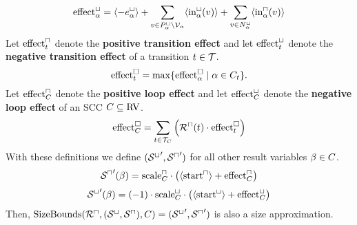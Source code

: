 \begin{theorem}
  \[ \text{effect}^\sqcup_\alpha = \langle-e^{\sqcup}_\alpha\rangle + \sum_{v \in P_\alpha^\sqcup \setminus \mathcal{V}_\alpha} \langle\text{in}^\sqcup_\alpha(v)\rangle + \sum_{v \in N_\alpha^\sqcup} \langle\text{in}^\sqcap_\alpha(v)\rangle \]
  Let $\text{effect}^\sqcap_t$ denote the \textbf{positive transition effect} and let $\text{effect}^\sqcup_t$ denote the \textbf{negative transition effect} of a transition $t \in \mathcal{T}$.
  \[ \text{effect}^\square_t = \max \lbrace \text{effect}^\square_\alpha \mid \alpha \in C_t  \rbrace. \]
  Let $\text{effect}^\sqcap_C$ denote the \textbf{positive loop effect} and let $\text{effect}^\sqcup_C$ denote the \textbf{negative loop effect} of an SCC $C \subseteq \text{RV}$.
  \[ \text{effect}^\square_C = \sum_{t \in \mathcal{T}_C} \left( {\mathcal{R}^\sqcap}(t) \cdot \text{effect}^\square_t \right) \]
  With these definitions we define $({\mathcal{S}^\sqcup}', {\mathcal{S}^\sqcap}')$ for all other result variables $\beta \in C$.
  \[ {\mathcal{S}^\sqcap}'(\beta) = \text{scale}^\sqcap_C \cdot \left( \langle\text{start}^\sqcap\rangle + \text{effect}^\sqcap_C \right) \]
  \[ {\mathcal{S}^\sqcup}'(\beta) = (-1) \cdot \text{scale}^\sqcup_C \cdot \left( \langle\text{start}^\sqcup\rangle + \text{effect}^\sqcup_C \right) \]
  Then, $\text{SizeBounds}({\mathcal{R}^\sqcap}, {({\mathcal{S}^\sqcup}, {\mathcal{S}^\sqcap})}, C) = ({\mathcal{S}^\sqcup}', {\mathcal{S}^\sqcap}')$ is also a size approximation. 
\end{theorem}
